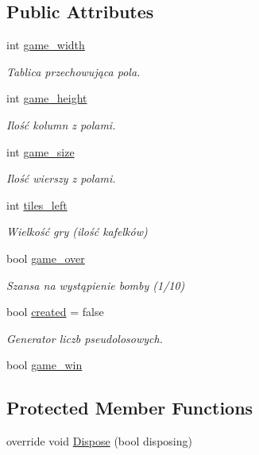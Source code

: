 \subsection*{Public Attributes}
\begin{DoxyCompactItemize}
\item 
int \mbox{\hyperlink{class_saper_1_1_game_ac555ca6b549cd5db36344c44d30f628d}{game\+\_\+width}}
\begin{DoxyCompactList}\small\item\em Tablica przechowująca pola. \end{DoxyCompactList}\item 
int \mbox{\hyperlink{class_saper_1_1_game_a4384a168c23e724b445de95a6af206ff}{game\+\_\+height}}
\begin{DoxyCompactList}\small\item\em Ilość kolumn z polami. \end{DoxyCompactList}\item 
int \mbox{\hyperlink{class_saper_1_1_game_a784f5ee2db8e065581bea6885af146a9}{game\+\_\+size}}
\begin{DoxyCompactList}\small\item\em Ilość wierszy z polami. \end{DoxyCompactList}\item 
int \mbox{\hyperlink{class_saper_1_1_game_a3acb80304c24bc43f5002d3ce578e7b9}{tiles\+\_\+left}}
\begin{DoxyCompactList}\small\item\em Wielkość gry (ilość kafelków) \end{DoxyCompactList}\item 
bool \mbox{\hyperlink{class_saper_1_1_game_a34bdb6551f2f859d65cd424b97c48d74}{game\+\_\+over}}
\begin{DoxyCompactList}\small\item\em Szansa na wystąpienie bomby (1/10) \end{DoxyCompactList}\item 
bool \mbox{\hyperlink{class_saper_1_1_game_adc5efafe49ceab9315e68c8077db0800}{created}} = false
\begin{DoxyCompactList}\small\item\em Generator liczb pseudolosowych. \end{DoxyCompactList}\item 
bool \mbox{\hyperlink{class_saper_1_1_game_a9cfb62bd4e52323d17b9a4f4b58f8a4f}{game\+\_\+win}}
\end{DoxyCompactItemize}
\subsection*{Protected Member Functions}
\begin{DoxyCompactItemize}
\item 
override void \mbox{\hyperlink{class_saper_1_1_game_af10b28306097f647aea5dbc84196fcd1}{Dispose}} (bool disposing)
\end{DoxyCompactItemize}


